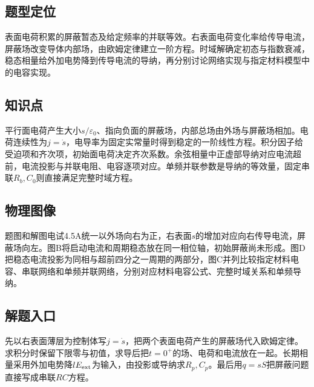 \documentclass[UTF8,fontset=fandol,a4paper,11pt]{ctexart}
\begin{document}


\subsection*{题型定位}

表面电荷积累的屏蔽暂态及给定频率的并联等效。右表面电荷变化率给传导电流，屏蔽场改变导体内部场，由欧姆定律建立一阶方程。时域解确定初态与指数衰减，稳态相量给外加电势降到传导电流的导纳，再分别讨论网络实现与指定材料模型中的电容实现。



\subsection*{知识点}

平行面电荷产生大小$s/\varepsilon_0$、指向负面的屏蔽场，内部总场由外场与屏蔽场相加。电荷连续性为$j=\dot s$，电导率为固定实常量时得到稳定的一阶线性方程。积分因子给受迫项和齐次项，初始面电荷决定齐次系数。余弦相量中正虚部导纳对应电流超前，电流投影与并联电阻、电容逐项对应。单频并联参数是导纳的等效量，固定串联$R_b,C_0$则直接满足完整时域方程。



\subsection*{物理图像}

题图和解图电试4.5A统一以外场向右为正，右表面$s$的增加对应向右传导电流，屏蔽场向左。图B将启动电流和周期稳态放在同一相位轴，初始屏蔽尚未形成。图D把稳态电流投影为同相与超前四分之一周期的两部分，图C并列比较指定材料电容、串联网络和单频并联网络，分别对应材料电容公式、完整时域关系和单频导纳。



\subsection*{解题入口}

先以右表面薄层为控制体写$j=\dot s$，把两个表面电荷产生的屏蔽场代入欧姆定律。求积分时保留下限零与初值，求导后把$t=0^+$的场、电荷和电流放在一起。长期相量采用外加电势降$lE_{\rm ext}$为输入，由投影或导纳求$R_p,C_p$。最后用$q=sS$把屏蔽问题直接写成串联$RC$方程。
\end{document}
